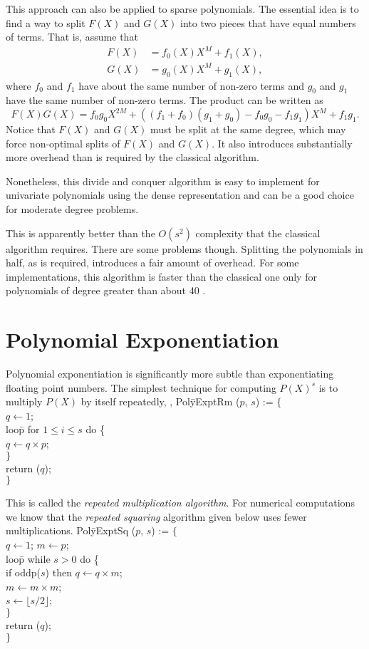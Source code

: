 This approach can also be applied to sparse polynomials.  The
essential idea is to find a way to split $F(X)$ and $G(X)$ into two
pieces that have equal numbers of terms.  That is, assume that
\[
\begin{aligned}
F(X)&= f_0(X) X^{M} + f_1(X),\\
G(X)&= g_0(X) X^{M} + g_1(X),
\end{aligned}
\]
where $f_0$ and $f_1$ have about the same number of non-zero terms and
$g_0$ and $g_1$ have the same number of non-zero terms.  The product
can be written as
\[
  F(X) G(X) = f_0 g_0 X^{2M} 
       + ((f_1 + f_0) (g_1 + g_0) - f_0 g_0 - f_1 g_1) X^{M}
       + f_1 g_1.
\]
Notice that $F(X)$ and $G(X)$ must be split at the same degree, which
may force non-optimal splits of  $F(X)$ and $G(X)$.  It also
introduces substantially more overhead than is required by the
classical algorithm.  

Nonetheless, this divide and conquer algorithm is easy to implement
for univariate polynomials using the dense representation and can be a
good choice for moderate degree problems.  

This is apparently better than the $O(s^2)$ complexity that the
classical algorithm requires.  There are some problems though.
Splitting the polynomials in half, as is required, introduces a fair
amount of overhead.  For some implementations, this algorithm is
faster than the classical one only for polynomials of degree greater
than about 40 \cite{Fateman74a}.


\section{Polynomial Exponentiation}
\label{Poly:Expt:Sec}

Polynomial exponentiation is significantly more subtle than
exponentiating floating point numbers.  The simplest technique for
computing $P(X)^s$ is to multiply $P(X)$ by itself repeatedly, \ie,
\begindsacode
Pol\=yExptRm ($p$, $s$) := $\{$\\
\> $q \leftarrow 1$; \\
\> loo\=p for $1 \le i \le s$ do \{\\
\> \> $q \leftarrow q \times p$; \\
\>\> $\}$ \\
\> return ($q$); \\
\>$\}$
\enddsacode

\noindent
This is called the {\em repeated multiplication algorithm\/}.  For numerical
computations we know that the {\em repeated squaring} algorithm given
below uses fewer multiplications.
\begindsacode
Pol\=yExptSq ($p$, $s$) := $\{$\\
\> $q \leftarrow 1$;  $m \leftarrow p$; \\
\> loo\=p while $s > 0$ do \{\\
\> \> if oddp($s$) then $q \leftarrow q \times m$; \\
\> \> $m \leftarrow m \times m$; \\
\> \> $s \leftarrow \lfloor s/2 \rfloor$; \\
\>\> $\}$ \\
\> return ($q$); \\
\> $\}$
\enddsacode

